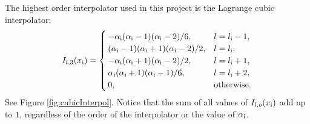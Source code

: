 The highest order interpolator used in this project is the Lagrange cubic interpolator: 
\begin{equation}\label{eq:cubicI}
    I_{l,3}(x_{\text{i}}) = \begin{cases}
        -\alpha_{\text{i}} (\alpha_{\text{i}}-1)(\alpha_{\text{i}}-2)/6, & l = l_{\text{i}}-1,\\
        (\alpha_{\text{i}}-1)(\alpha_{\text{i}}+1)(\alpha_{\text{i}}-2)/2,  & l = l_{\text{i}},\\
        -\alpha_{\text{i}} (\alpha_{\text{i}}+1)(\alpha_{\text{i}}-2)/2, & l = l_{\text{i}} + 1,\\
        \alpha_{\text{i}} (\alpha_{\text{i}}+1)(\alpha_{\text{i}}-1)/6, & l = l_{\text{i}} + 2,\\
        0, & \text{otherwise.}
    \end{cases}
\end{equation}
See Figure \ref{fig:cubicInterpol}. 
Notice that the sum of all values of $I_{l, o}(x_{\text{i}})$ add up to $1$, regardless of the order of the interpolator or the value of $\alpha_{\text{i}}$.


